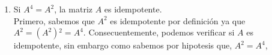 \begin{enumerate}[label=\listAlph]
        \item Si \(A^4 = A^2\), la matriz \(A\) es idempotente. \\
            Primero, sabemos que \(A^2\) es idempotente por definición ya que \(A^2 = \left(A^2\right){}^2 = A^4\).
            Consecuentemente, podemos verificar si \(A\) es idempotente, sin embargo como sabemos por hipotesis que, \(A^2 = A^4\),
    \end{enumerate}
